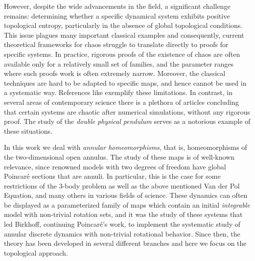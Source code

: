 \documentclass[12pt,a4paper]{amsart}
\theoremstyle{definition}
\theoremstyle{remark}
\begin{document}
However, despite the wide advancements in the field, a significant challenge remains: determining whether a specific dynamical system exhibits positive topological entropy, particularly in the absence of global topological conditions. This issue plagues many important classical examples and consequently, current theoretical frameworks for chaos struggle to translate directly to proofs  for specific systems. In practice, rigorous proofs of the existence of chaos are often available only for a relatively small set of families, and the parameter ranges where such proofs work is often extremely narrow. Moreover, the classical techniques are hard to be adapted to specific maps, and hence cannot be used in a systematic way. References like \cite{Clone,Cltwo,Levsecondorder,HolmesHoket,holmesmeli,laisangyoung,haiduc} exemplify these limitations. In contrast, in several areas of contemporary science there is a plethora of articles concluding that certain systems are chaotic after numerical simulations, without any rigorous proof. The study of the \emph{double physical pendulum} serves as a notorious example of these situations.
 
  
In this work we deal with \emph{annular homeomorphisms}, that is, homeomorphisms of the two-dimensional open annulus. The study of these maps is of well-known relevance, since renowned models with two degrees of freedom have global Poincar\'{e} sections that are annuli. In particular, this is the case for some  restrictions of the $3$-body problem as well as the  above mentioned Van der Pol Equation, and many others in various fields of science. These dynamics can often be displayed as a parameterized family of maps which contain an initial \emph{integrable} model with non-trivial rotation sets, and it was the study of these systems that led Birkhoff, continuing Poincar\'{e}'s work, to implement the systematic study of annular discrete dynamics with non-trivial rotational behavior.
Since then, the theory has been developed in several different branches and here we focus on the topological approach. 
\end{document}
